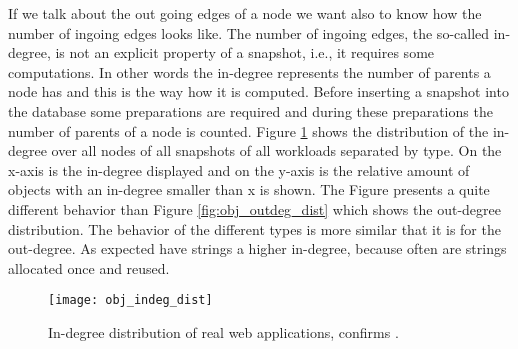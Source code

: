 If we talk about the out going edges of a node we want also to know how the number of ingoing edges looks like. The number of ingoing edges, the so-called in-degree, is not an explicit property of a snapshot, i.e., it requires some computations. In other words the in-degree represents the number of parents a node has and this is the way how it is computed. Before inserting a snapshot into the database some preparations are required and during these preparations the number of parents of a node is counted. Figure \ref{fig:obj_indeg_dist} shows the distribution of the in-degree over all nodes of all snapshots of all workloads separated by type. On the x-axis is the in-degree displayed and on the y-axis is the relative amount of objects with an in-degree smaller than x is shown. The Figure presents a quite different behavior than Figure \ref{fig:obj_outdeg_dist} which shows the out-degree distribution. The behavior of the different types is more similar that it is for the out-degree. As expected have strings a higher in-degree, because often are strings allocated once and reused.
\begin{figure}
	\centering
	\texttt{[image: obj\_indeg\_dist]}
	\caption{In-degree distribution of real web applications, confirms \cite{JSMeter2009}.}
	\label{fig:obj_indeg_dist}
\end{figure}

